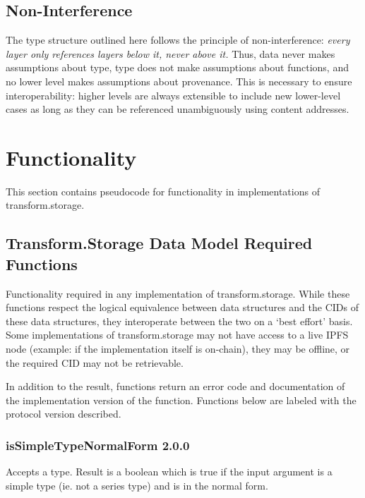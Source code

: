 \documentclass[9pt, oneside]{article}   	%
\begin{document}
\vspace{.25 cm}

\subsection{Non-Interference}\label{nonInterference}
The type structure outlined here follows the principle of non-interference: \textit{every layer only references layers below it, never above it.} Thus, data never makes assumptions about type, type does not make assumptions about functions, and no lower level makes assumptions about provenance. This is necessary to ensure interoperability: higher levels are always extensible to include new lower-level cases as long as they can be referenced unambiguously using content addresses. 


\section{Functionality}\label{pseudocode}

This section contains pseudocode for functionality in implementations of transform.storage.

\subsection{Transform.Storage Data Model Required Functions}\label{dataModelFuncs}

Functionality required in any implementation of transform.storage. While these functions respect the logical equivalence between data structures and the CIDs of these data structures, they interoperate between the two on a `best effort' basis. Some implementations of transform.storage may not have access to a live IPFS node (example: if the implementation itself is on-chain), they may be offline, or the required CID may not be retrievable.

In addition to the result, functions return an error code and documentation of the implementation version of the function. Functions below are labeled with the protocol version described.

\subsubsection{isSimpleTypeNormalForm 2.0.0}\label{isSimpleTypeNormalForm_code}

Accepts a type. Result is a boolean which is true if the input argument is a simple type (ie. not a series type) and is in the normal form.
\end{document}
